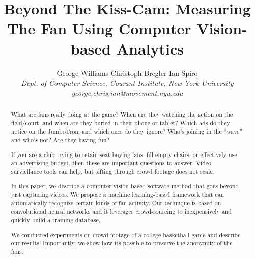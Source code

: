 \documentclass[times, 10pt,twocolumn]{article}
\begin{document}
\title{Beyond The Kiss-Cam: Measuring The Fan Using Computer Vision-based Analytics}

\author{George Williams  \hspace{0.1in} Christoph Bregler \hspace{0.1in} Ian Spiro \hspace{0.1in} \\
\emph{Dept. of Computer Science, Courant Institute, New York University}\\
\emph{george,chris,ian@movement.nyu.edu}\\
}


\maketitle

\thispagestyle{empty}

\begin{abstract}
What are fans really doing at the game?  When are they watching the action on the field/court, and when are they buried in their phone or tablet?  Which ads do they notice on the JumboTron, and which ones do they ignore?  Who’s joining in the “wave” and who’s not?  Are they having fun?

If you are a club trying to retain seat-buying fans, fill empty chairs, or effectively use an advertising budget, then these are important questions to answer. Video surviellance tools can help, but sifting through crowd footage does not scale.

In this paper, we describe a computer vision-based software method that goes beyond just capturing videos.  We propose a machine learning-based framework that can automatically recognize certain kinds of fan activity.  Our technique is based on convolutional neural networks and it leverages crowd-sourcing to inexpensively and quickly build a training database.

We conducted experiments on crowd footage of a college basketball game and describe our results.  Importantly, we show how its possible to preserve the anonymity of the fans.

\end{abstract}
\end{document}
